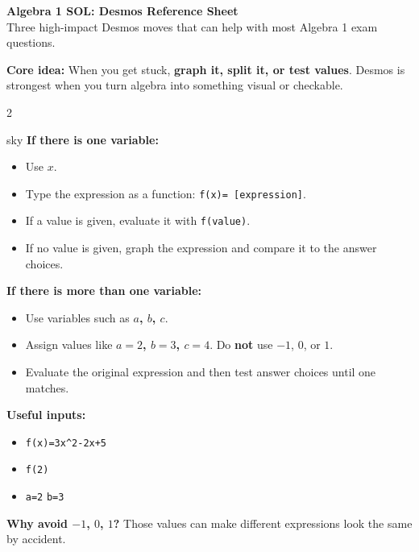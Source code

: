 \documentclass[11pt]{article}
\newcommand{\code}[1]{\texttt{#1}}
\begin{document}
{\Large\bfseries Algebra 1 SOL: Desmos Reference Sheet}\\[2pt]
{\small Three high-impact Desmos moves that can help with most Algebra 1 exam questions.}

\vspace{0.5em}
\begin{tcolorbox}[colback=sky,colframe=navy,boxrule=0.9pt,arc=2mm,left=2mm,right=2mm,top=1.5mm,bottom=1.5mm]
\textbf{Core idea:} When you get stuck, \textbf{graph it, split it, or test values}. Desmos is strongest when you turn algebra into something visual or checkable.
\end{tcolorbox}

\vspace{0.5em}
\begin{multicols}{2}

\begin{skillbox}{sky}
\textbf{If there is one variable:}
\begin{itemize}
  \item Use \textbf{$x$}.
  \item Type the expression as a function: \code{f(x)= [expression]}.
  \item If a value is given, evaluate it with \code{f(value)}.
  \item If no value is given, graph the expression and compare it to the answer choices.
\end{itemize}

\textbf{If there is more than one variable:}
\begin{itemize}
  \item Use variables such as \textbf{$a$, $b$, $c$}.
  \item Assign values like \textbf{$a=2$, $b=3$, $c=4$}. Do \textbf{not} use $-1$, $0$, or $1$.
  \item Evaluate the original expression and then test answer choices until one matches.
\end{itemize}

\textbf{Useful inputs:}
\begin{itemize}
  \item \code{f(x)=3x\^{}2-2x+5}
  \item \code{f(2)}
  \item \code{a=2} \hspace{1em} \code{b=3}
\end{itemize}

\textbf{Why avoid $-1$, $0$, $1$?} Those values can make different expressions look the same by accident.
\end{skillbox}


\end{multicols}
\end{document}
